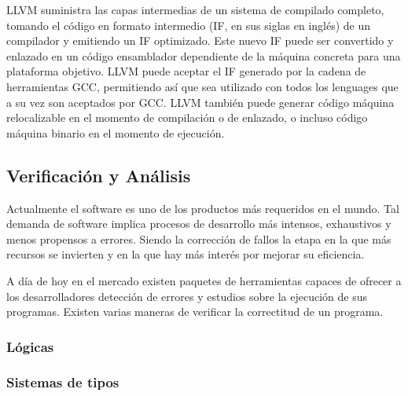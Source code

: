 LLVM suministra las capas intermedias de un sistema de compilado completo, tomando el c\'odigo en formato intermedio (IF, en sus siglas en ingl\'es) de un compilador y emitiendo un IF optimizado. Este nuevo IF puede ser convertido y enlazado en un c\'odigo ensamblador dependiente de la m\'aquina concreta para una plataforma objetivo. LLVM puede aceptar el IF generado por la cadena de herramientas GCC, permitiendo as\'i que sea utilizado con todos los lenguages que a su vez son aceptados por GCC. LLVM tambi\'en puede generar c\'odigo m\'aquina relocalizable en el momento de compilaci\'on o de enlazado, o incluso c\'odigo m\'aquina binario en el momento de ejecuci\'on.

\subsection{Verificaci\'on y An\'alisis}
\label{ap2:sec:veryana}

Actualmente el software es uno de los productos m\'as requeridos en el mundo. Tal demanda de software implica procesos de desarrollo m\'as intensos, exhaustivos y menos propensos a errores. Siendo la correcci\'on de fallos la etapa en la que m\'as recursos se invierten y en la que hay m\'as inter\'es por mejorar su eficiencia. 

A d\'ia de hoy en el mercado existen paquetes de herramientas capaces de ofrecer a los desarrolladores detecci\'on de errores y estudios sobre la ejecuci\'on de sus programas. Existen varias maneras de verificar la correctitud de un programa.

\subsubsection*{L\'ogicas}
\label{ap2:sec:logicas}



\subsubsection*{Sistemas de tipos}
\label{ap2:sec:tipos}


